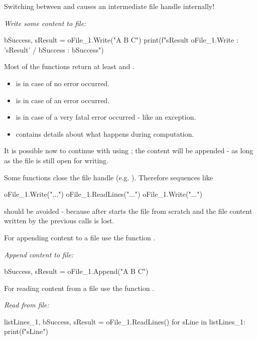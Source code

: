 Switching between  and  causes an intermediate file handle  internally!

\textit{Write some content to file:}

\begin{pythoncode}
bSuccess, sResult = oFile_1.Write("A B C")
print(f"sResult oFile_1.Write : '{sResult}' / bSuccess : {bSuccess}")
\end{pythoncode}

Most of the functions return at least  and .

\begin{itemize}
   \item {} is  in case of no error occurred.
   \item {} is  in case of an error occurred.
   \item {} is  in case of a very fatal error occurred - like an exception.
   \item {} contains details about what happens during computation.
\end{itemize}

It is possible now to continue with using ; the content will be appended - as long as the file
is still open for writing.

Some functions close the file handle (e.g. ). Therefore sequences like

\begin{pythoncode}
oFile_1.Write("...")
oFile_1.ReadLines("...")
oFile_1.Write("...")
\end{pythoncode}

should be avoided - because  after  starts the file from scratch and the file content
written by the previous  calls is lost.

For appending content to a file use the function .

\textit{Append content to file:}

\begin{pythoncode}
bSuccess, sResult = oFile_1.Append("A B C")
\end{pythoncode}

For reading content from a file use the function .

\textit{Read from file:}

\begin{pythoncode}
listLines_1, bSuccess, sResult = oFile_1.ReadLines()
for sLine in listLines_1:
   print(f"{sLine}")
\end{pythoncode}

